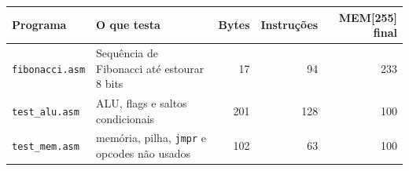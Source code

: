 \begin{tabularx}{\linewidth}{l X r r r}
\toprule
Programa & O que testa & Bytes & Instruções & MEM[255] final \\
\midrule
\texttt{fibonacci.asm} & Sequência de Fibonacci até estourar 8 bits & 17 & 94 & 233 \\
\texttt{test\_alu.asm} & ALU, flags e saltos condicionais & 201 & 128 & 100 \\
\texttt{test\_mem.asm} & memória, pilha, \texttt{jmpr} e opcodes não usados & 102 & 63 & 100 \\
\bottomrule
\end{tabularx}

